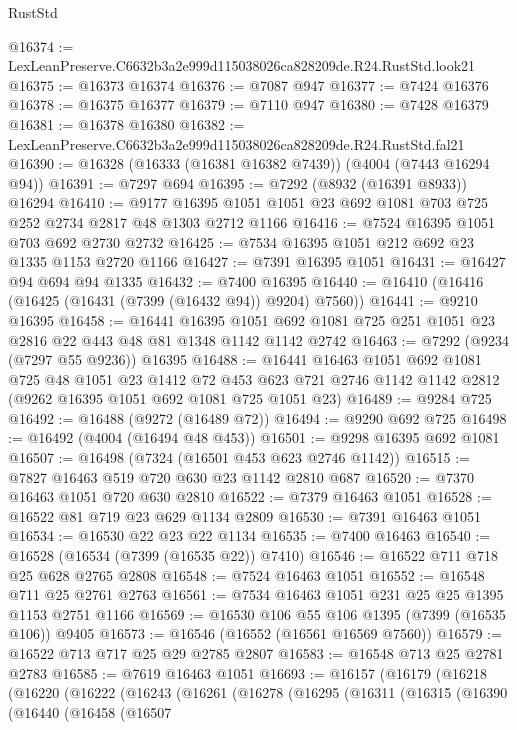 \begin{lexlean}{RustStd}
\begin{coremodule}
@16374 := LexLeanPreserve.C6632b3a2e999d115038026ca828209de.R24.RustStd.look21
@16375 := @16373 @16374
@16376 := @7087 @947
@16377 := @7424 @16376
@16378 := @16375 @16377
@16379 := @7110 @947
@16380 := @7428 @16379
@16381 := @16378 @16380
@16382 := LexLeanPreserve.C6632b3a2e999d115038026ca828209de.R24.RustStd.fal21
@16390 := @16328 (@16333 (@16381 @16382 @7439)) (@4004 (@7443 @16294 @94))
@16391 := @7297 @694
@16395 := @7292 (@8932 (@16391 @8933)) @16294
@16410 := @9177 @16395 @1051 @1051 @23 @692 @1081 @703 @725 @252 @2734 @2817 @48 @1303 @2712 @1166
@16416 := @7524 @16395 @1051 @703 @692 @2730 @2732
@16425 := @7534 @16395 @1051 @212 @692 @23 @1335 @1153 @2720 @1166
@16427 := @7391 @16395 @1051
@16431 := @16427 @94 @694 @94 @1335
@16432 := @7400 @16395
@16440 := @16410 (@16416 (@16425 (@16431 (@7399 (@16432 @94)) @9204) @7560))
@16441 := @9210 @16395
@16458 := @16441
    @16395
    @1051
    @692
    @1081
    @725
    @251
    @1051
    @23
    @2816
    @22
    @443
    @48
    @81
    @1348
    @1142
    @1142
    @2742
@16463 := @7292 (@9234 (@7297 @55 @9236)) @16395
@16488 := @16441
    @16463
    @1051
    @692
    @1081
    @725
    @48
    @1051
    @23
    @1412
    @72
    @453
    @623
    @721
    @2746
    @1142
    @1142
    @2812
    (@9262 @16395 @1051 @692 @1081 @725 @1051 @23)
@16489 := @9284 @725
@16492 := @16488 (@9272 (@16489 @72))
@16494 := @9290 @692 @725
@16498 := @16492 (@4004 (@16494 @48 @453))
@16501 := @9298 @16395 @692 @1081
@16507 := @16498 (@7324 (@16501 @453 @623 @2746 @1142))
@16515 := @7827 @16463 @519 @720 @630 @23 @1142 @2810 @687
@16520 := @7370 @16463 @1051 @720 @630 @2810
@16522 := @7379 @16463 @1051
@16528 := @16522 @81 @719 @23 @629 @1134 @2809
@16530 := @7391 @16463 @1051
@16534 := @16530 @22 @23 @22 @1134
@16535 := @7400 @16463
@16540 := @16528 (@16534 (@7399 (@16535 @22)) @7410)
@16546 := @16522 @711 @718 @25 @628 @2765 @2808
@16548 := @7524 @16463 @1051
@16552 := @16548 @711 @25 @2761 @2763
@16561 := @7534 @16463 @1051 @231 @25 @25 @1395 @1153 @2751 @1166
@16569 := @16530 @106 @55 @106 @1395 (@7399 (@16535 @106)) @9405
@16573 := @16546 (@16552 (@16561 @16569 @7560))
@16579 := @16522 @713 @717 @25 @29 @2785 @2807
@16583 := @16548 @713 @25 @2781 @2783
@16585 := @7619 @16463 @1051
@16693 := @16157
    (@16179
      (@16218
        (@16220
          (@16222
            (@16243
              (@16261
                (@16278
                  (@16295
                    (@16311
                      (@16315
                        (@16390
                          (@16440
                            (@16458
                              (@16507

\end{coremodule}
\end{lexlean}
